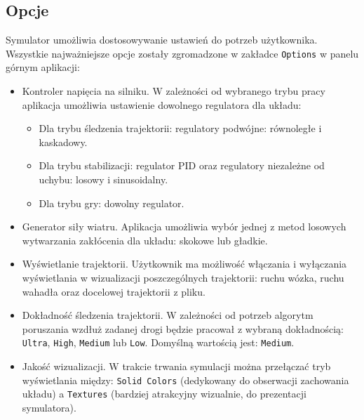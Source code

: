 \documentclass[12pt, oneside]{report}
\theoremstyle{definition}
\begin{document}
\subsection{Opcje}
Symulator umożliwia dostosowywanie ustawień do potrzeb użytkownika. Wszystkie najważniejsze opcje zostały zgromadzone w zakładce \texttt{Options} w panelu górnym aplikacji:
\begin{itemize}
\item Kontroler napięcia na silniku. W zależności od wybranego trybu pracy aplikacja umożliwia ustawienie dowolnego regulatora dla układu:
\begin{itemize}
\item Dla trybu śledzenia trajektorii: regulatory podwójne: równoległe i kaskadowy.
\item Dla trybu stabilizacji: regulator PID oraz regulatory niezależne od uchybu: losowy i sinusoidalny.
\item Dla trybu gry: dowolny regulator.
\end{itemize}
\item Generator siły wiatru. Aplikacja umożliwia wybór jednej z metod losowych wytwarzania zakłócenia dla układu: skokowe lub gładkie.
\item Wyświetlanie trajektorii. Użytkownik ma możliwość włączania i wyłączania wyświetlania w wizualizacji poszczególnych trajektorii: ruchu wózka, ruchu wahadła oraz docelowej trajektorii z pliku.
\item Dokładność śledzenia trajektorii. W zależności od potrzeb algorytm poruszania wzdłuż zadanej drogi będzie pracował z wybraną dokładnością: \texttt{Ultra}, \texttt{High}, \texttt{Medium} lub \texttt{Low}. Domyślną wartością jest: \texttt{Medium}.
\item Jakość wizualizacji. W trakcie trwania symulacji można przełączać tryb wyświetlania między: \texttt{Solid Colors} (dedykowany do obserwacji zachowania układu) a \texttt{Textures} (bardziej atrakcyjny wizualnie, do prezentacji symulatora).
\end{itemize}
\end{document}
